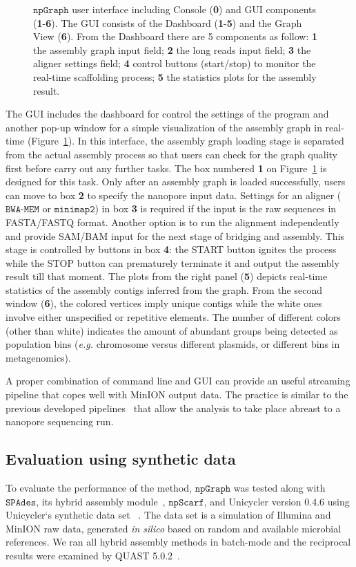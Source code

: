 \documentclass[10pt,twocolumn,twoside]{genpaper}
\newcommand{\npscarf}{$\mathtt{npScarf}$}
\newcommand{\npgraph}{$\mathtt{npGraph}$}
\newcommand{\spades}{$\mathtt{SPAdes}$}
\newcommand{\minimap}{$\mathtt{minimap2}$}
\newcommand{\bwa}{$\mathtt{BWA\text{-}MEM}$}
\newcommand{\EG}{\emph{e.g.}}
\begin{document}
\begin{figure}[!hpt]
{{    }
}
\caption[\npgraph{} user interface]{\npgraph{} user interface including Console (\textbf{0}) and GUI components (\textbf{1}-\textbf{6}). The GUI consists of the Dashboard (\textbf{1}-\textbf{5}) and the Graph View (\textbf{6}). From the Dashboard there are 5 components as follow: \textbf{1} the assembly graph input field; \textbf{2} the long reads input field; \textbf{3} the aligner settings field; \textbf{4} control buttons (start/stop) to monitor the real-time scaffolding process; \textbf{5} the statistics plots for the assembly result.}
\label{figure:npgraph_gui}
\end{figure}

The GUI includes the dashboard for control the settings of the program and another pop-up window for a simple visualization of the assembly graph in real-time (Figure~\ref{figure:npgraph_gui}).
In this interface, the assembly graph loading stage is separated from the actual assembly process so that users can check for the graph quality first before carry out any further tasks. The box numbered \textbf{1} on Figure~\ref{figure:npgraph_gui} is designed for this task.
Only after an assembly graph is loaded successfully, users can move to box \textbf{2} to specify the nanopore input data.
Settings for an aligner (\bwa{} or \minimap{}) in box \textbf{3} is required if the input is the raw sequences in FASTA/FASTQ format. Another option is to run the alignment independently and provide SAM/BAM input for the next stage of bridging and assembly. This stage is controlled by buttons in box \textbf{4}: the START button ignites the process while the STOP button can prematurely terminate it and output the assembly result till that moment. The plots from the right panel (\textbf{5}) depicts real-time statistics of the assembly contigs inferred from the graph.
From the second window (\textbf{6}), the colored vertices imply unique contigs while the white ones involve either unspecified or repetitive elements. The number of different colors (other than white) indicates the amount of abundant groups being detected as population bins (\EG{} chromosome versus different plasmids, or different bins in metagenomics).

A proper combination of command line and GUI can provide an useful streaming pipeline that copes well with MinION output data. The practice is similar to the previous developed pipelines~\cite{CaoGC2016,Cao2017scaffolding,Nguyen2017barcode} that allow the analysis to take place abreast to a nanopore sequencing run.

\subsection*{Evaluation using synthetic data}
To evaluate the performance of the method, \npgraph{} was tested along with \spades{}, its hybrid assembly module~\cite{AntipovKM2015}, \npscarf{}, and Unicycler version 0.4.6 using Unicycler`s synthetic data set~ \cite{Wick2017unicycler} . 
The data set is a simulation of Illumina and MinION raw data, generated \emph{in silico} based on random and available microbial references. 
We ran all hybrid assembly methods in batch-mode and the reciprocal results were examined by QUAST 5.0.2~\cite{Mikheenko2018quast5}. 
\end{document}
